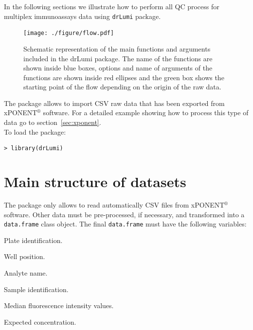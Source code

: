 \documentclass[11pt]{article}\usepackage[]{graphicx}\usepackage[]{color}
\makeatletter
\newenvironment{kframe}{%
 \def\at@end@of@kframe{}%
 \ifinner\ifhmode%
  \def\at@end@of@kframe{\end{minipage}}%
  \begin{minipage}{\columnwidth}%
 \fi\fi%
 \def\FrameCommand##1{\hskip\@totalleftmargin \hskip-\fboxsep
 \colorbox{shadecolor}{##1}\hskip-\fboxsep
     \hskip-\linewidth \hskip-\@totalleftmargin \hskip\columnwidth}%
 \MakeFramed {\advance\hsize-\width
   \@totalleftmargin\z@ \linewidth\hsize
   \@setminipage}}%
 {\par\unskip\endMakeFramed%
 \at@end@of@kframe}
\newenvironment{knitrout}{}{} %
\newenvironment{itemize*}%
    {\begin{itemize}%
        \setlength{\itemsep}{-0.35cm}%
        \setlength{\parskip}{10pt}}%
{\end{itemize}}
\makeatother
\begin{document}
\newpage
\noindent In the following sections we illustrate how to perform all QC process 
for multiplex immunoassays data using {\tt drLumi} package.

\begin{figure}[h!]
\begin{center}
    \texttt{[image: ./figure/flow.pdf]}
\end{center}
\caption{Schematic representation of the main functions and arguments included in the drLumi package. The name of the functions are shown inside blue boxes, options and name of arguments of the functions are shown inside red ellipses and the green box shows the starting point of the flow depending on the origin of the raw data.}
\end{figure}


\noindent The package allows to import CSV raw data that has been 
exported from xPONENT$^\circledR$ software. For a detailed example showing how to 
process this type of data go to section~\ref{sec:xponent}.\\

\noindent To load the package: 
\begin{knitrout}
\color{fgcolor}\begin{kframe}
\begin{verbatim}
> library(drLumi)
\end{verbatim}
\end{kframe}
\end{knitrout}



\newpage
\section{Main structure of datasets}

The package only allows to read automatically CSV files from xPONENT$^\circledR$ software. 
Other data must be pre-processed, if necessary, and transformed into 
a {\tt data.frame} class object. The final {\tt data.frame} must have the 
following variables:

\begin{itemize*}
    \item Plate identification.
    \item Well position.
    \item Analyte name.
    \item Sample identification.
    \item Median fluorescence intensity values.
    \item Expected concentration.
\end{itemize*}
\end{document}
